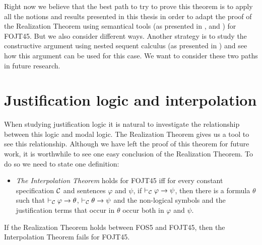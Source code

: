 \qquad Right now we believe that the best path to try to prove this theorem is to apply all the notions and results presented in this thesis in order to adapt the proof of the Realization Theorem using semantical tools (as presented in \cite{Fitting13}, \cite{Fitting13R} and \cite{Fitting14R}) for FOJT45. But we also consider different ways. Another strategy is to study the constructive argument using nested sequent calculus (as presented in \cite{Kuz10}) and see how this argument can be used for this case.
We want to consider these two paths in future research.


\section{Justification logic and interpolation}


\qquad When studying justification logic it is natural to investigate the relationship between this logic and modal logic. The Realization Theorem gives us a tool to see this relationship. Although we have left the proof of this theorem for future work, it is worthwhile to see one easy conclusion of the Realization Theorem. To do so we need to state one definition:



\begin{itemize}
\item[] \textit{The Interpolation Theorem} holds for FOJT45 iff for every constant specification $\mathcal{C}$ and sentences $\varphi$ and $\psi$, if $\vdash_{\mathcal{C}} \varphi \rightarrow\psi$, then there is a formula $\theta$ such that $\vdash_{\mathcal{C}} \varphi \rightarrow \theta$, $\vdash_{\mathcal{C}} \theta \rightarrow \psi$ and the non-logical symbols and the justification terms that occur in $\theta$ occur both in $\varphi$ and $\psi$.
\end{itemize}




\begin{pro}
If the Realization Theorem holds between FOS5 and FOJT45, then the Interpolation Theorem fails for FOJT45. 
\end{pro}



